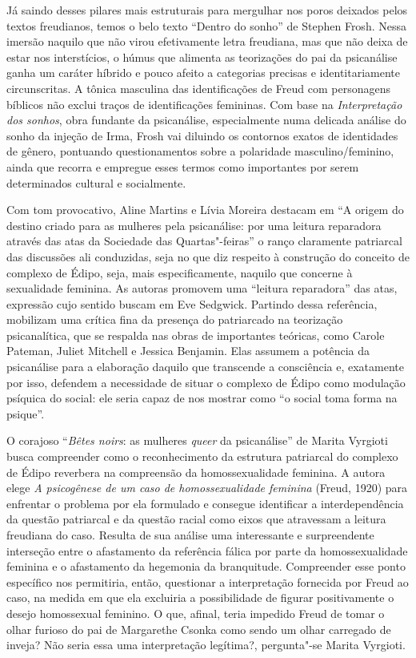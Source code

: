 Já saindo desses pilares mais estruturais para mergulhar nos poros
deixados pelos textos freudianos, temos o belo texto ``Dentro do sonho''
de Stephen Frosh. Nessa imersão naquilo que não virou efetivamente letra
freudiana, mas que não deixa de estar nos interstícios, o húmus que
alimenta as teorizações do pai da psicanálise ganha um caráter híbrido e
pouco afeito a categorias precisas e identitariamente circunscritas. A
tônica masculina das identificações de Freud com personagens bíblicos
não exclui traços de identificações femininas. Com base na
\emph{Interpretação dos sonhos}, obra fundante da psicanálise,
especialmente numa delicada análise do sonho da injeção de Irma, Frosh
vai diluindo os contornos exatos de identidades de gênero, pontuando
questionamentos sobre a polaridade masculino/feminino, ainda que recorra
e empregue esses termos como importantes por serem determinados cultural
e socialmente.

Com tom provocativo, Aline Martins e Lívia Moreira destacam em ``A
origem do destino criado para as mulheres pela psicanálise: por uma
leitura reparadora através das atas da Sociedade das Quartas"-feiras'' o
ranço claramente patriarcal das discussões ali conduzidas, seja no que
diz respeito à construção do conceito de complexo de Édipo, seja, mais
especificamente, naquilo que concerne à sexualidade feminina. As autoras
promovem uma ``leitura reparadora'' das atas, expressão cujo sentido
buscam em Eve Sedgwick. Partindo dessa referência, mobilizam uma crítica
fina da presença do patriarcado na teorização psicanalítica, que se
respalda nas obras de importantes teóricas, como Carole Pateman, Juliet
Mitchell e Jessica Benjamin. Elas assumem a potência da psicanálise para
a elaboração daquilo que transcende a consciência e, exatamente por
isso, defendem a necessidade de situar o complexo de Édipo como
modulação psíquica do social: ele seria capaz de nos mostrar como ``o
social toma forma na psique''.

O corajoso ``\emph{Bêtes noirs}: as mulheres \emph{queer} da psicanálise'' de Marita Vyrgioti busca
compreender como o reconhecimento da estrutura patriarcal do complexo de
Édipo reverbera na compreensão da homossexualidade feminina. A autora
elege \emph{A psicogênese de um caso de homossexualidade feminina}
(Freud, 1920) para enfrentar o problema por ela formulado e consegue
identificar a interdependência da questão patriarcal e da questão racial
como eixos que atravessam a leitura freudiana do caso. Resulta de sua
análise uma interessante e surpreendente interseção entre o afastamento
da referência fálica por parte da homossexualidade feminina e o
afastamento da hegemonia da branquitude. Compreender esse ponto
específico nos permitiria, então, questionar a interpretação fornecida
por Freud ao caso, na medida em que ela excluiria a possibilidade de
figurar positivamente o desejo homossexual feminino. O que, afinal,
teria impedido Freud de tomar o olhar furioso do pai de Margarethe
Csonka como sendo um olhar carregado de inveja? Não seria essa uma
interpretação legítima?, pergunta"-se Marita Vyrgioti.


